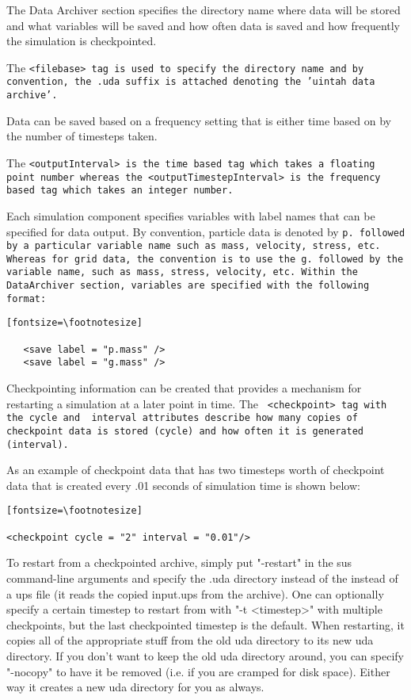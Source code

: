 The Data Archiver section specifies the directory name where data will
be stored and what variables will be saved and how often data is saved
and how frequently the simulation is checkpointed.

The \tt <filebase> \normalfont tag is used to specify the directory
name and by convention, the .uda suffix is attached denoting the
'uintah data archive'.


Data can be saved based on a frequency setting that is either time
based on by the number of timesteps taken. 

The \tt <outputInterval> \normalfont is the time based tag which takes
a floating point number whereas the \tt <outputTimestepInterval>
\normalfont is the frequency based tag which takes an integer number.


Each simulation component specifies variables with label names that
can be specified for data output.  By convention, particle data is
denoted by \tt p. \normalfont followed by a particular variable name
such as mass, velocity, stress, etc.  Whereas for grid data, the
convention is to use the \tt g. \normalfont followed by the variable
name, such as mass, stress, velocity, etc.  Within the DataArchiver
section, variables are specified with the following format:

\begin{verbatim}[fontsize=\footnotesize]

   <save label = "p.mass" />
   <save label = "g.mass" />

\end{verbatim}


Checkpointing information can be created that provides a mechanism for
restarting a simulation at a later point in time.  The \tt
<checkpoint> \normalfont tag with the \tt cycle \normalfont and \tt
interval \normalfont attributes describe how many copies of checkpoint
data is stored (cycle)  and how often it is generated (interval). 

As an example of checkpoint data that has two timesteps worth of
checkpoint data that is created every .01 seconds of simulation time
is shown below:

\begin{verbatim}[fontsize=\footnotesize]

<checkpoint cycle = "2" interval = "0.01"/>

\end{verbatim}


To restart from a checkpointed archive, simply put "-restart" in the
sus command-line arguments and specify the .uda directory instead of
the instead of a ups file (it reads the copied input.ups from the
archive).  One can optionally specify a certain timestep to restart
from with "-t <timestep>" with multiple checkpoints, but the
last checkpointed timestep is the default.  When restarting, it
copies all of the appropriate stuff from the old uda directory to its
new uda directory.  If you don't want to keep the old uda directory
around, you can specify "-nocopy" to have it be removed (i.e. if you
are cramped for disk space).  Either way it creates a new uda
directory for you as always.

